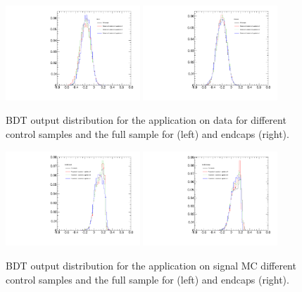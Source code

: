\begin{figure}
  \centering
  \includegraphics[width=0.45\textwidth]{Figures/ApplicationBDTOutput_Barrel.pdf}
  \includegraphics[width=0.45\textwidth]{Figures/ApplicationBDTOutput_Endcaps.pdf}
  \caption{BDT output distribution for the application on data for different control samples and the full sample for (left) and endcaps (right).}
  \label{fig:applicationBDTOutputBarrel}
\end{figure}

\begin{figure}
  \centering
  \includegraphics[width=0.45\textwidth]{Figures/ApplicationBDTOutput_BsMCBarrel.pdf}
  \includegraphics[width=0.45\textwidth]{Figures/ApplicationBDTOutput_BsMCEndcaps.pdf}
  \caption{BDT output distribution for the application on \BsMuMu signal MC different control samples and the full sample for (left) and endcaps (right).}
  \label{fig:applicationBDTOutputEndcaps}
\end{figure}
